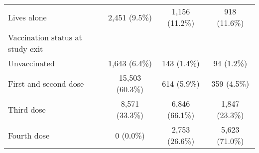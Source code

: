 \begin{longtable}[t]{>{\raggedright\arraybackslash}p{6cm}ccc}
\hspace{1em}Lives alone & 2,451 (9.5\%) & 1,156 (11.2\%) & 918 (11.6\%)\\
Vaccination status at study exit &  &  & \\
\hspace{1em}Unvaccinated & 1,643 (6.4\%) & 143 (1.4\%) & 94 (1.2\%)\\
\hspace{1em}First and second dose & 15,503 (60.3\%) & 614 (5.9\%) & 359 (4.5\%)\\
\hspace{1em}Third dose & 8,571 (33.3\%) & 6,846 (66.1\%) & 1,847 (23.3\%)\\
\hspace{1em}Fourth dose & 0 (0.0\%) & 2,753 (26.6\%) & 5,623 (71.0\%)\\
\bottomrule
\end{longtable}
